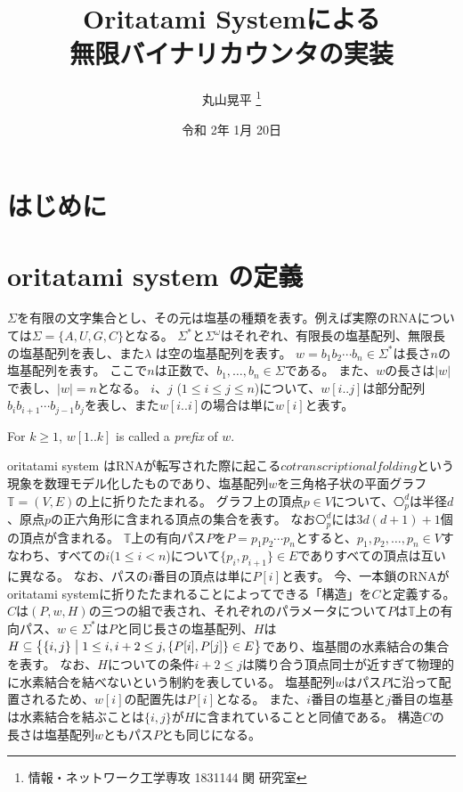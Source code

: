 \documentclass[a4j,11pt]{article}
\title{Oritatami Systemによる\\無限バイナリカウンタの実装}
\author{丸山晃平
\thanks{情報・ネットワーク工学専攻 1831144 関 研究室}
}
\date{令和 2年 1月 20日}%
\begin{document}
\maketitle

\section{はじめに}

\section{oritatami system の定義}
$\Sigma$を有限の文字集合とし、その元は塩基の種類を表す。例えば実際のRNAについては$\Sigma = \{ A,U,G,C \}$となる。
$\Sigma^*$と$\Sigma^\omega$はそれぞれ、有限長の塩基配列、無限長の塩基配列を表し、また$\lambda$ は空の塩基配列を表す。
$w = b_1 b_2 \cdots b_n \in \Sigma^*$は長さ$n$の塩基配列を表す。
ここで$n$は正数で、$b_1, \ldots, b_n \in \Sigma$である。
また、$w$の長さは$|w|$で表し、$|w| = n$となる。
$i$、$j$ ($1 \le i \le j \le n$)について、$w[i..j]$は部分配列$b_i b_{i+1} \cdots b_{j-1} b_j$を表し、また$w[i..i]$の場合は単に$w[i]$と表す。


For $k \ge 1$, $w[1..k]$ is called a \textit{prefix} of $w$. 

oritatami system はRNAが転写された際に起こる$cotranscriptional folding$という現象を数理モデル化したものであり、塩基配列$w$を三角格子状の平面グラフ$\mathbb{T} = (V, E)$の上に折りたたまれる。
グラフ上の頂点$p \in V$について、$\hexagon_p^d$は半径$d$、原点$p$の正六角形に含まれる頂点の集合を表す。
なお$\hexagon_p^d$には$3d(d+1)+1$個の頂点が含まれる。
$\mathbb{T}$上の有向パス$P$を$P = p_1 p_2 \cdots p_n$とすると、$p_1, p_2, \ldots, p_n \in V$すなわち、すべての$i $($1 \le i < n$)について$\{p_i, p_{i+1}\} \in E$でありすべての頂点は互いに異なる。
なお、パスの$i$番目の頂点は単に$P[i]$と表す。
今、一本鎖のRNAがoritatami systemに折りたたまれることによってできる「構造」を$C$と定義する。
$C$は$(P, w, H)$の三つの組で表され、それぞれのパラメータについて$P$は$\mathbb{T}$上の有向パス、$w \in \Sigma^*$は$P$と同じ長さの塩基配列、$H$は$H \subseteq \bigl\{\{i, j\} \bigm| 1 \le i, i+2 \le j, \{P[i], P[j]\} \in E \bigr\}$であり、塩基間の水素結合の集合を表す。
なお、$H$についての条件$i+2 \le j$は隣り合う頂点同士が近すぎて物理的に水素結合を結べないという制約を表している。
塩基配列$w$はパス$P$に沿って配置されるため、$w[i]$の配置先は$P[i]$となる。
また、$i$番目の塩基と$j$番目の塩基は水素結合を結ぶことは$\{i, j\}$が$H$に含まれていることと同値である。
構造$C$の長さは塩基配列$w$ともパス$P$とも同じになる。
\end{document}
